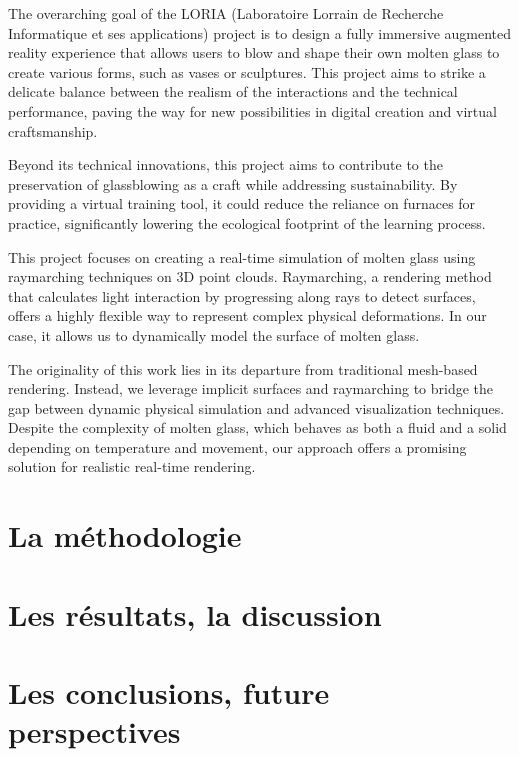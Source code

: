 \documentclass{rapportcs}
\begin{document}
    The overarching goal of the LORIA (Laboratoire Lorrain de Recherche Informatique et ses applications) project is to design a fully immersive augmented reality experience that allows users to blow and shape their own molten glass to create various forms, such as vases or sculptures. This project aims to strike a delicate balance between the realism of the interactions and the technical performance, paving the way for new possibilities in digital creation and virtual craftsmanship.

    Beyond its technical innovations, this project aims to contribute to the preservation of glassblowing as a craft while addressing sustainability. By providing a virtual training tool, it could reduce the reliance on furnaces for practice, significantly lowering the ecological footprint of the learning process.

    This project focuses on creating a real-time simulation of molten glass using raymarching techniques on 3D point clouds. Raymarching, a rendering method that calculates light interaction by progressing along rays to detect surfaces, offers a highly flexible way to represent complex physical deformations. In our case, it allows us to dynamically model the surface of molten glass.

    The originality of this work lies in its departure from traditional mesh-based rendering. Instead, we leverage implicit surfaces and raymarching to bridge the gap between dynamic physical simulation and advanced visualization techniques. Despite the complexity of molten glass, which behaves as both a fluid and a solid depending on temperature and movement, our approach offers a promising solution for realistic real-time rendering.

    \section{La méthodologie}


    \section{Les résultats, la discussion}
    \begin{enumerate}
    \end{enumerate}



    \section{Les conclusions, future perspectives}
\end{document}
